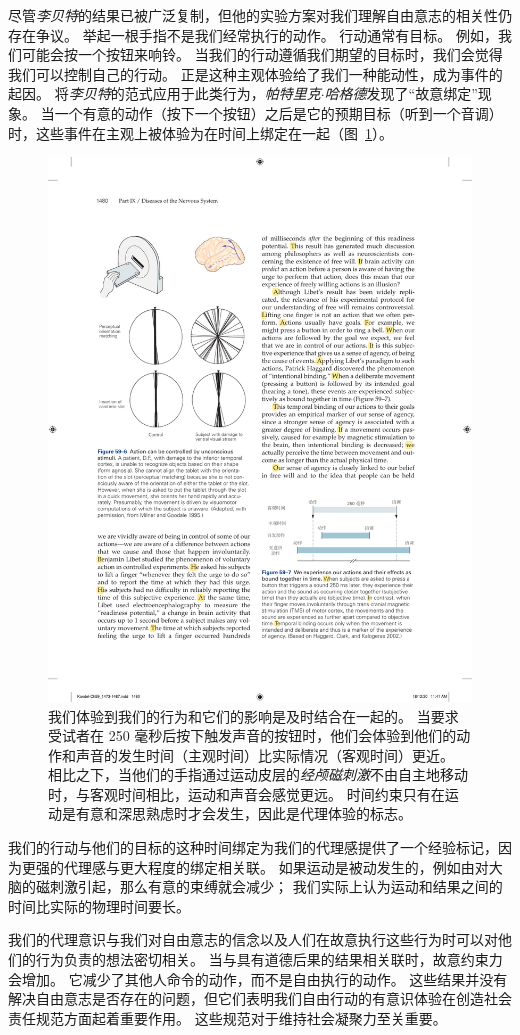 尽管\textit{李贝特}的结果已被广泛复制，但他的实验方案对我们理解自由意志的相关性仍存在争议。
举起一根手指不是我们经常执行的动作。
行动通常有目标。
例如，我们可能会按一个按钮来响铃。
当我们的行动遵循我们期望的目标时，我们会觉得我们可以控制自己的行动。
正是这种主观体验给了我们一种能动性，成为事件的起因。
将\textit{李贝特}的范式应用于此类行为，\textit{帕特里克$\cdot$哈格德}发现了“故意绑定”现象。
当一个有意的动作（按下一个按钮）之后是它的预期目标（听到一个音调）时，这些事件在主观上被体验为在时间上绑定在一起（图~\ref{fig:59_7}）。


\begin{figure}[htbp]
	\centering
	\includegraphics[width=0.64\linewidth]{chap59/fig_59_7}
	\caption{我们体验到我们的行为和它们的影响是及时结合在一起的。
		当要求受试者在 250 毫秒后按下触发声音的按钮时，他们会体验到他们的动作和声音的发生时间（主观时间）比实际情况（客观时间）更近。
		相比之下，当他们的手指通过运动皮层的\textit{经颅磁刺激}不由自主地移动时，与客观时间相比，运动和声音会感觉更远。
		时间约束只有在运动是有意和深思熟虑时才会发生，因此是代理体验的标志\cite{haggard2002voluntary}。}
	\label{fig:59_7}
\end{figure}


我们的行动与他们的目标的这种时间绑定为我们的代理感提供了一个经验标记，因为更强的代理感与更大程度的绑定相关联。
如果运动是被动发生的，例如由对大脑的磁刺激引起，那么有意的束缚就会减少；
我们实际上认为运动和结果之间的时间比实际的物理时间要长。


我们的代理意识与我们对自由意志的信念以及人们在故意执行这些行为时可以对他们的行为负责的想法密切相关。
当与具有道德后果的结果相关联时，故意约束力会增加。
它减少了其他人命令的动作，而不是自由执行的动作。
这些结果并没有解决自由意志是否存在的问题，但它们表明我们自由行动的有意识体验在创造社会责任规范方面起着重要作用。
这些规范对于维持社会凝聚力至关重要。


